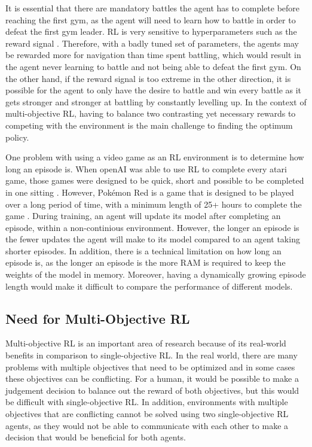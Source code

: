 It is essential that there are mandatory battles the agent has to complete before reaching the first gym, as the agent will need to learn how to battle in order to defeat the first gym leader. RL is very sensitive to hyperparameters such as the reward signal \cite{XanderSteenbrugge2019ppo}. Therefore, with a badly tuned set of parameters, the agents may be rewarded more for navigation than time spent battling, which would result in the agent never learning to battle and not being able to defeat the first gym. On the other hand, if the reward signal is too extreme in the other direction, it is possible for the agent to only have the desire to battle and win every battle as it gets stronger and stronger at battling by constantly levelling up. In the context of multi-objective RL, having to balance two contrasting yet necessary rewards to competing with the environment is the main challenge to finding the optimum policy. 

One problem with using a video game as an RL environment is to determine how long an episode is. When openAI was able to use RL to complete every atari game, those games were designed to be quick, short and possible to be completed in one sitting \cite{brockman2016openai}. However, Pokémon Red is a game that is designed to be played over a long period of time, with a minimum length of 25+ hours to complete the game \cite{howlongtobeat}. During training, an agent will update its model after completing an episode, within a non-continious environment. However, the longer an episode is the fewer updates the agent will make to its model compared to an agent taking shorter episodes. In addition, there is a technical limitation on how long an episode is, as the longer an episode is the more RAM is required to keep the weights of the model in memory. Moreover, having a dynamically growing episode length would make it difficult to compare the performance of different models.


\subsection{Need for Multi-Objective RL} 

Multi-objective RL is an important area of research because of its real-world benefits in comparison to single-objective RL. In the real world, there are many problems with multiple objectives that need to be optimized and in some cases these objectives can be conflicting. For a human, it would be possible to make a judgement decision to balance out the reward of both objectives, but this would be difficult with single-objective RL. In addition, environments with multiple objectives that are conflicting cannot be solved using two single-objective RL agents, as they would not be able to communicate with each other to make a decision that would be beneficial for both agents. %

